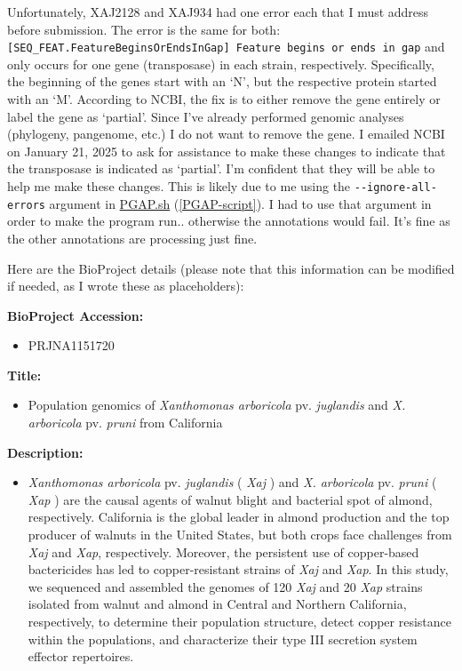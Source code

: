 \documentclass[
]{book}
\providecommand{\tightlist}{%
  \setlength{\itemsep}{0pt}\setlength{\parskip}{0pt}}
\begin{document}
Unfortunately, XAJ2128 and XAJ934 had one error each that I must address before submission. The error is the same for both: \texttt{{[}SEQ\_FEAT.FeatureBeginsOrEndsInGap{]}\ Feature\ begins\ or\ ends\ in\ gap} and only occurs for one gene (transposase) in each strain, respectively. Specifically, the beginning of the genes start with an `N', but the respective protein started with an `M'. According to NCBI, the fix is to either remove the gene entirely or label the gene as `partial'. Since I've already performed genomic analyses (phylogeny, pangenome, etc.) I do not want to remove the gene. I emailed NCBI on January 21, 2025 to ask for assistance to make these changes to indicate that the transposase is indicated as `partial'. I'm confident that they will be able to help me make these changes. This is likely due to me using the \texttt{-\/-ignore-all-errors} argument in \hyperref[PGAP-script]{PGAP.sh} (\ref{PGAP-script}). I had to use that argument in order to make the program run.. otherwise the annotations would fail. It's fine as the other annotations are processing just fine.

Here are the BioProject details (please note that this information can be modified if needed, as I wrote these as placeholders):

\textbf{BioProject Accession:}

\begin{itemize}
\tightlist
\item
  PRJNA1151720
\end{itemize}

\textbf{Title:}

\begin{itemize}
\tightlist
\item
  Population genomics of \emph{Xanthomonas arboricola} pv. \emph{juglandis} and \emph{X. arboricola} pv. \emph{pruni} from California
\end{itemize}

\textbf{Description:}

\begin{itemize}
\tightlist
\item
  \emph{Xanthomonas arboricola} pv. \emph{juglandis} ( \emph{Xaj} ) and \emph{X. arboricola} pv. \emph{pruni} ( \emph{Xap} ) are the causal agents of walnut blight and bacterial spot of almond, respectively. California is the global leader in almond production and the top producer of walnuts in the United States, but both crops face challenges from \emph{Xaj} and \emph{Xap}, respectively. Moreover, the persistent use of copper-based bactericides has led to copper-resistant strains of \emph{Xaj} and \emph{Xap}. In this study, we sequenced and assembled the genomes of 120 \emph{Xaj} and 20 \emph{Xap} strains isolated from walnut and almond in Central and Northern California, respectively, to determine their population structure, detect copper resistance within the populations, and characterize their type III secretion system effector repertoires.
\end{itemize}
\end{document}
